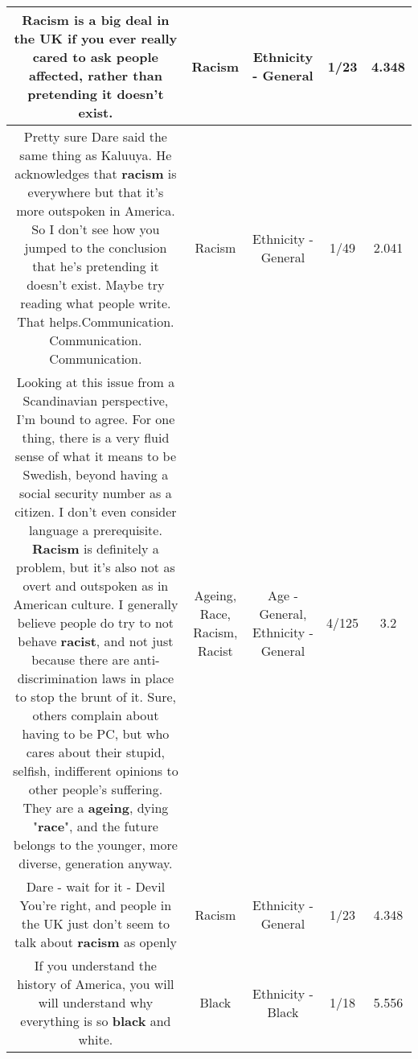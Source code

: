 \documentclass[11pt]{article}
\newlength\mylength
\begin{document}
\begin{center}
\begin{longtable}{|C{.65\mylength}|C{.30\mylength}|C{.12\mylength}|C{.12\mylength}|C{.12\mylength}|}
  \small Racism is a big deal in the UK if you ever really cared to ask people affected, rather than pretending it doesn't exist.\normalsize   & Racism & Ethnicity - General & 1/23 & 4.348 \\  \hline
  \small Pretty sure Dare said the same thing as Kaluuya. He acknowledges that \textbf{racism} is everywhere but that it's more outspoken in America. So I don't see how you jumped to the conclusion that he's pretending it doesn't exist. Maybe try reading what people write. That helps.Communication. Communication. Communication.\normalsize   & Racism & Ethnicity - General & 1/49 & 2.041 \\  \hline
  \small Looking at this issue from a Scandinavian perspective, I'm bound to agree. For one thing, there is a very fluid sense of what it means to be Swedish, beyond having a social security number as a citizen. I don't even consider language a prerequisite. \textbf{Racism} is definitely a problem, but it's also not as overt and outspoken as in American culture. I generally believe people do try to not behave \textbf{racist}, and not just because there are anti-discrimination laws in place to stop the brunt of it. Sure, others complain about having to be PC, but who cares about their stupid, selfish, indifferent opinions to other people's suffering. They are a \textbf{ageing}, dying "\textbf{race}", and the future belongs to the younger, more diverse, generation anyway.\normalsize   & Ageing, Race, Racism, Racist & Age - General, Ethnicity - General & 4/125 & 3.2 \\  \hline
  \small Dare - wait for it - Devil You're right, and people in the UK just don't seem to talk about \textbf{racism} as openly\normalsize   & Racism & Ethnicity - General & 1/23 & 4.348 \\  \hline
  \small If you understand the history of America, you will will understand why everything is so \textbf{black} and white.\normalsize   & Black & Ethnicity - Black & 1/18 & 5.556 \\  \hline

\end{longtable}
\end{center}
\end{document}
